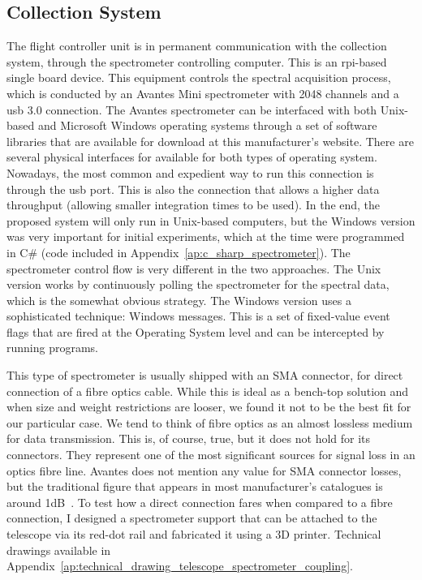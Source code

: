\subsection{Collection System}%
\label{sub:methods_collection}

The flight controller unit is in permanent communication with the
collection system, through the spectrometer controlling computer. This
is an \gls{rpi}-based single board device. This equipment controls the
spectral acquisition process, which is conducted by an Avantes Mini
spectrometer with 2048 channels and a \gls{usb} 3.0 connection. The
Avantes spectrometer can be interfaced with both Unix-based and
Microsoft Windows operating systems through a set of software libraries
that are available for download at this manufacturer's website. There
are several physical interfaces for available for both types of
operating system. Nowadays, the most common and expedient way to run
this connection is through the \gls{usb} port. This is also the
connection that allows a higher data throughput (allowing smaller
integration times to be used). In the end, the proposed system will only
run in Unix-based computers, but the Windows version was very important
for initial experiments, which at the time were programmed in C\# (code
included in Appendix~\ref{ap:c_sharp_spectrometer}). The spectrometer
control flow is very different in the two approaches. The Unix version
works by continuously polling the spectrometer for the spectral data,
which is the somewhat obvious strategy. The Windows version uses a
sophisticated technique: Windows messages. This is a set of fixed-value
event flags that are fired at the Operating System level and can be
intercepted by running programs.

This type of spectrometer is usually shipped with an \gls{SMA}
connector, for direct connection of a fibre optics cable. While this is
ideal as a bench-top solution and when size and weight restrictions are
looser, we found it not to be the best fit for our particular case. We
tend to think of fibre optics as an almost lossless medium for data
transmission. This is, of course, true, but it does not hold for its
connectors. They represent one of the most significant sources for
signal loss in an optics fibre line. Avantes does not mention any value
for \gls{SMA} connector losses, but the traditional figure that appears
in most manufacturer's catalogues is around 1dB~\cite{diamond2021,
Optics, amphenol2002}. To test how a direct connection fares when
compared to a fibre connection, I designed a spectrometer support that
can be attached to the telescope via its red-dot rail and fabricated it
using a 3D printer. Technical drawings available in
Appendix~\ref{ap:technical_drawing_telescope_spectrometer_coupling}.

